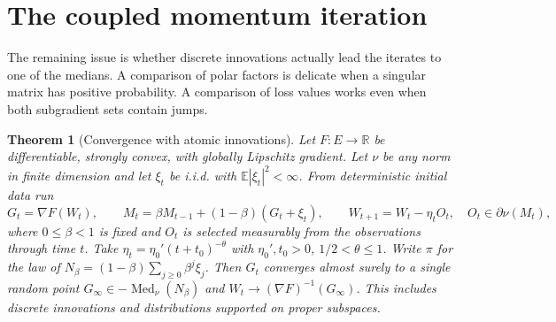 \documentclass[10pt,letterpaper]{article}
\newtheorem{theorem}{Theorem}
\newcommand{\E}{\mathbb E}
\newcommand{\R}{\mathbb R}
\newcommand{\Med}{\operatorname{Med}}
\begin{document}
\section{The coupled momentum iteration}

The remaining issue is whether discrete innovations actually lead the iterates to one of the medians. A comparison of polar factors is delicate when a singular matrix has positive probability. A comparison of loss values works even when both subgradient sets contain jumps.

\begin{theorem}[Convergence with atomic innovations]\label{th:momentum}
Let $F:E\to\R$ be differentiable, strongly convex, with globally Lipschitz gradient. Let $\nu$ be any norm in finite dimension and let $\xi_t$ be i.i.d. with $\E|\xi_t|^2<\infty$. From deterministic initial data run
\[
 G_t=\nabla F(W_t),\qquad
 M_t=\beta M_{t-1}+(1-\beta)(G_t+\xi_t),\qquad
 W_{t+1}=W_t-\eta_t O_t,\quad O_t\in\partial\nu(M_t),
\]
where $0\le\beta<1$ is fixed and $O_t$ is selected measurably from the observations through time $t$. Take $\eta_t=\eta_0'(t+t_0)^{-\theta}$ with $\eta_0',t_0>0$, $1/2<\theta\le1$. Write $\pi$ for the law of $N_\beta=(1-\beta)\sum_{j\ge0}\beta^j\xi_j$. Then $G_t$ converges almost surely to a single random point $G_\infty\in-\Med_\nu(N_\beta)$ and $W_t\to(\nabla F)^{-1}(G_\infty)$. This includes discrete innovations and distributions supported on proper subspaces.
\end{theorem}
\end{document}
